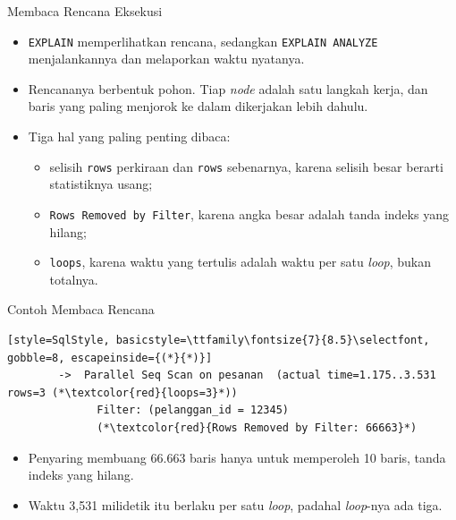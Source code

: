 \documentclass[aspectratio=169, table, 12pt]{beamer}
\begin{document}
\begin{frame}{{\Large Membaca Rencana Eksekusi}}
  \vspace{4pt}
  \begin{itemize}
    \item \texttt{EXPLAIN} memperlihatkan rencana, sedangkan
          \texttt{EXPLAIN ANALYZE} menjalankannya dan melaporkan waktu
          nyatanya.
    \item Rencananya berbentuk pohon. Tiap \textit{node} adalah satu langkah
          kerja, dan baris yang paling menjorok ke dalam dikerjakan lebih
          dahulu.
    \item Tiga hal yang paling penting dibaca:
    \begin{itemize}
      \item selisih \texttt{rows} perkiraan dan \texttt{rows} sebenarnya,
            karena selisih besar berarti statistiknya usang;
      \item \texttt{Rows Removed by Filter}, karena angka besar adalah tanda
            indeks yang hilang;
      \item \texttt{loops}, karena waktu yang tertulis adalah waktu per satu
            \textit{loop}, bukan totalnya.
    \end{itemize}
  \end{itemize}

\end{frame}

\begin{frame}[fragile]{{\Large Contoh Membaca Rencana}}
  \vspace{6pt}
\begin{lstlisting}[style=SqlStyle, basicstyle=\ttfamily\fontsize{7}{8.5}\selectfont, gobble=8, escapeinside={(*}{*)}]
        ->  Parallel Seq Scan on pesanan  (actual time=1.175..3.531 rows=3 (*\textcolor{red}{loops=3}*))
              Filter: (pelanggan_id = 12345)
              (*\textcolor{red}{Rows Removed by Filter: 66663}*)
\end{lstlisting}

  \vspace{6pt}
  \begin{itemize}
    \item Penyaring membuang 66.663 baris hanya untuk memperoleh 10 baris,
          tanda indeks yang hilang.
    \item Waktu 3,531 milidetik itu berlaku per satu \textit{loop}, padahal
          \textit{loop}-nya ada tiga.
  \end{itemize}
\end{frame}
\end{document}
